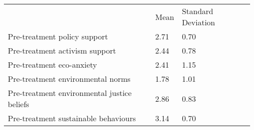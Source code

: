 \documentclass{article}
\begin{document}
\begin{table}[!h]
\centering
\begin{tabular}{lll}
\cline{1-3}
\multicolumn{1}{|l}{} &
  \multicolumn{1}{|l}{Mean} &
  \multicolumn{1}{|l|}{Standard Deviation} \\
\cline{1-3}
\multicolumn{1}{|l}{Pre-treatment policy support} &
  \multicolumn{1}{|l}{2.71} &
  \multicolumn{1}{|l|}{0.70} \\
\cline{1-3}
\multicolumn{1}{|l}{Pre-treatment activism support} &
  \multicolumn{1}{|l}{2.44} &
  \multicolumn{1}{|l|}{0.78} \\
\cline{1-3}
\multicolumn{1}{|l}{Pre-treatment eco-anxiety} &
  \multicolumn{1}{|l}{2.41} &
  \multicolumn{1}{|l|}{1.15} \\
\cline{1-3}
\multicolumn{1}{|l}{Pre-treatment environmental norms} &
  \multicolumn{1}{|l}{1.78} &
  \multicolumn{1}{|l|}{1.01} \\
\cline{1-3}
\multicolumn{1}{|l}{Pre-treatment environmental justice beliefs} &
  \multicolumn{1}{|l}{2.86} &
  \multicolumn{1}{|l|}{0.83} \\
\cline{1-3}
\multicolumn{1}{|l}{Pre-treatment sustainable behaviours} &
  \multicolumn{1}{|l}{3.14} &
  \multicolumn{1}{|l|}{0.70} \\
\cline{1-3}
\end{tabular}
\end{table}
\end{document}
